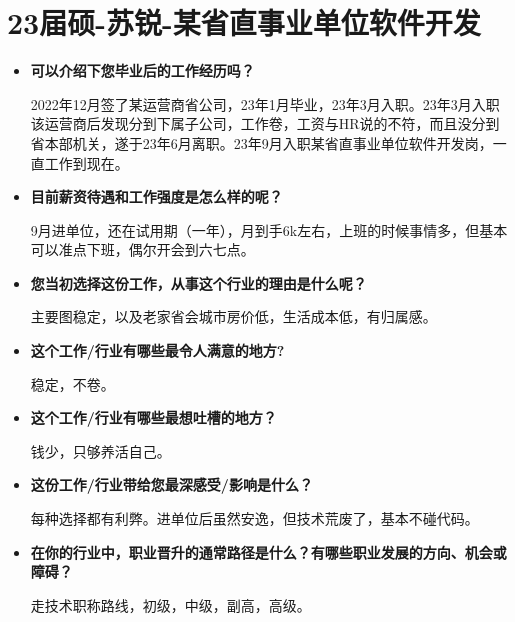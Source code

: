 \newpage
\section{23届硕-苏锐-某省直事业单位软件开发}
\begin{itemize}

\setlength{\parindent}{2em} 
    \item \textbf{可以介绍下您毕业后的工作经历吗？}

2022年12月签了某运营商省公司，23年1月毕业，23年3月入职。23年3月入职该运营商后发现分到下属子公司，工作卷，工资与HR说的不符，而且没分到省本部机关，遂于23年6月离职。23年9月入职某省直事业单位软件开发岗，一直工作到现在。

    \item \textbf{目前薪资待遇和工作强度是怎么样的呢？}

9月进单位，还在试用期（一年），月到手6k左右，上班的时候事情多，但基本可以准点下班，偶尔开会到六七点。


    \item \textbf{您当初选择这份工作，从事这个行业的理由是什么呢？}

主要图稳定，以及老家省会城市房价低，生活成本低，有归属感。

  
    \item \textbf{这个工作/行业有哪些最令人满意的地方?}

稳定，不卷。


    \item \textbf{这个工作/行业有哪些最想吐槽的地方？}

钱少，只够养活自己。

    \item \textbf{这份工作/行业带给您最深感受/影响是什么？}

每种选择都有利弊。进单位后虽然安逸，但技术荒废了，基本不碰代码。

    \item \textbf{在你的行业中，职业晋升的通常路径是什么？有哪些职业发展的方向、机会或障碍？}

走技术职称路线，初级，中级，副高，高级。

\end{itemize}